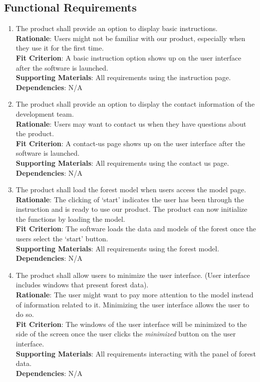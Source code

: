 \documentclass{article}
\begin{document}
\subsection{Functional Requirements}

\begin{enumerate}[FR1]
\item The product shall provide an option to display basic
instructions.\\
\textbf{Rationale}: Users might not be familiar with our
product, especially when they use it for the first time.\\
\textbf{Fit Criterion}: A basic instruction option shows up
on the user interface after the software is launched. \\
\textbf{Supporting Materials}: All requirements using the instruction page.\\
\textbf{Dependencies}: N/A\\

\item The product shall provide an option to display the contact information of
the development team.\\
\textbf{Rationale}: Users may want to contact us when they have questions about the product.\\
\textbf{Fit Criterion}: A contact-us page shows up
on the user interface after the software is launched. \\
\textbf{Supporting Materials}: All requirements using the contact us page.\\
\textbf{Dependencies}: N/A\\
	
\item The product shall load the forest model when users access the model
page.\\
\textbf{Rationale}: The clicking of `start' indicates the
user has been through the instruction and is ready to use
our product. The product can now initialize the functions
by loading the model.\\
\textbf{Fit Criterion}: The software loads the data and 
models of the forest once the users select the `start' 
button.\\
\textbf{Supporting Materials}: All requirements using the forest model.\\
\textbf{Dependencies}: N/A\\


\item The product shall allow users to minimize the user
interface. (User interface includes windows that present
forest data). \\
\textbf{Rationale}: The user might want to pay more 
attention to the model instead of information related to
it. Minimizing the user interface allows the user to do so. \\
\textbf{Fit Criterion}: The windows of the user interface
will be minimized to the side of the screen once the user
clicks the \textit{minimized} button on the user interface.\\
\textbf{Supporting Materials}: All requirements interacting with the panel of forest data.\\
\textbf{Dependencies}: N/A\\


\end{enumerate}
\end{document}
